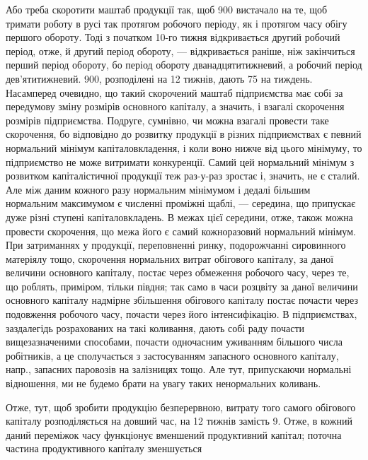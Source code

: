 Або треба скоротити маштаб продукції так, щоб 900 вистачало
на те, щоб тримати роботу в русі так протягом робочого періоду,
як і протягом часу обігу першого обороту. Тоді з початком
10-го тижня відкривається другий робочий період, отже, й другий період
обороту, — відкривається раніше, ніж закінчиться перший період обороту,
бо період обороту дванадцятитижневий, а робочий період дев’ятитижневий.
900, розподілені на 12 тижнів, дають 75 на тиждень.
Насамперед очевидно, що такий скорочений маштаб підприємства має
собі за передумову зміну розмірів основного капіталу, а значить, і взагалі
скорочення розмірів підприємства. Подруге, сумнівно, чи можна взагалі
провести таке скорочення, бо відповідно до розвитку продукції в різних
підприємствах є певний нормальний мінімум капіталовкладення, і коли
воно нижче від цього мінімуму, то підприємство не може витримати конкуренції.
Самий цей нормальний мінімум з розвитком капіталістичної
продукції теж раз-у-раз зростає і, значить, не є сталий. Але між даним
кожного разу нормальним мінімумом і дедалі більшим нормальним максимумом
є численні проміжні щаблі, — середина, що припускає дуже різні ступені
капіталовкладень. В межах цієї середини, отже, також можна провести
скорочення, що межа його є самий кожноразовий нормальний мінімум.
При затриманнях у продукції, переповненні ринку, подорожчанні сировинного
матеріялу тощо, скорочення нормальних витрат обігового капіталу,
за даної величини основного капіталу, постає через обмеження
робочого часу, через те, що роблять, приміром, тільки півдня; так само
в часи розцвіту за даної величини основного капіталу надмірне збільшення
обігового капіталу постає почасти через подовження робочого часу,
почасти через його інтенсифікацію. В підприємствах, заздалегідь розрахованих
на такі коливання, дають собі раду почасти вищезазначеними
способами, почасти одночасним уживанням більшого числа робітників,
а це сполучається з застосуванням запасного основного капіталу, напр.,
запасних паровозів на залізницях тощо. Але тут, припускаючи нормальні
відношення, ми не будемо брати на увагу таких ненормальних коливань.

\roztyagnut
Отже, тут, щоб зробити продукцію безперервною, витрату того самого
обігового капіталу розподіляється на довший час, на 12 тижнів замість 9.
Отже, в кожний даний переміжок часу функціонує вменшений продуктивний
капітал; поточна частина продуктивного капіталу зменшується
\parbreak{}  %
